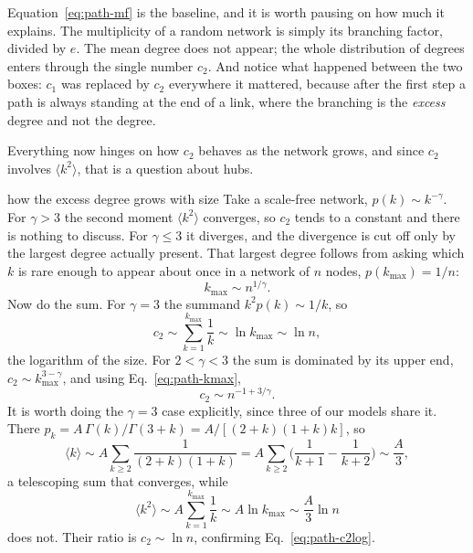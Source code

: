 Equation~\eqref{eq:path-mf} is the baseline, and it is worth pausing on how much it
explains. The multiplicity of a random network is simply its branching factor,
divided by $e$. The mean degree does not appear; the whole distribution of degrees
enters through the single number $c_2$. And notice what happened between the two
boxes: $c_1$ was replaced by $c_2$ everywhere it mattered, because after the first
step a path is always standing at the end of a link, where the branching is the
\emph{excess} degree and not the degree.

Everything now hinges on how $c_2$ behaves as the network grows, and since $c_2$
involves $\langle k^2\rangle$, that is a question about hubs.

\begin{calculation}{how the excess degree grows with size}
Take a scale-free network, $p(k)\sim k^{-\gamma}$. For $\gamma>3$ the second moment
$\langle k^2\rangle$ converges, so $c_2$ tends to a constant and there is nothing
to discuss. For $\gamma\le3$ it diverges, and the divergence is cut off only by the
largest degree actually present. That largest degree follows from asking which $k$
is rare enough to appear about once in a network of $n$ nodes, $p(k_{\max})=1/n$:
\begin{equation}
  k_{\max}\sim n^{1/\gamma}.
  \label{eq:path-kmax}
\end{equation}
Now do the sum. For $\gamma=3$ the summand $k^2 p(k)\sim1/k$, so
\begin{equation}
  c_2 \sim \sum_{k=1}^{k_{\max}}\frac{1}{k} \sim \ln k_{\max} \sim \ln n,
  \label{eq:path-c2log}
\end{equation}
the logarithm of the size. For $2<\gamma<3$ the sum is dominated by its upper end,
$c_2\sim k_{\max}^{3-\gamma}$, and using Eq.~\eqref{eq:path-kmax},
\begin{equation}
  c_2 \sim n^{-1+3/\gamma}.
  \label{eq:path-c2pow}
\end{equation}
It is worth doing the $\gamma=3$ case explicitly, since three of our models share
it. There $p_k = A\,\Gamma(k)/\Gamma(3+k) = A/[(2+k)(1+k)k]$, so
\begin{equation}
  \langle k\rangle \sim A\sum_{k\ge2}\frac{1}{(2+k)(1+k)}
  = A\sum_{k\ge2}\Big(\frac{1}{k+1}-\frac{1}{k+2}\Big) \sim \frac{A}{3},
  \label{eq:path-k1exp}
\end{equation}
a telescoping sum that converges, while
\begin{equation}
  \langle k^2\rangle \sim A\sum_{k=1}^{k_{\max}}\frac{1}{k}
  \sim A\ln k_{\max} \sim \frac{A}{3}\ln n
  \label{eq:path-k2exp}
\end{equation}
does not. Their ratio is $c_2\sim\ln n$, confirming Eq.~\eqref{eq:path-c2log}.
\end{calculation}

